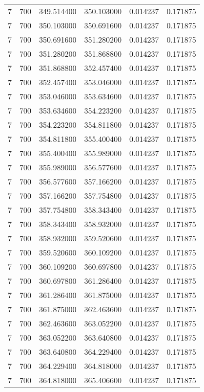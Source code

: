 \begin{longtable}{rrrrrr}
7 & 700 & 349.514400 & 350.103000 & 0.014237 & 0.171875 \\
7 & 700 & 350.103000 & 350.691600 & 0.014237 & 0.171875 \\
7 & 700 & 350.691600 & 351.280200 & 0.014237 & 0.171875 \\
7 & 700 & 351.280200 & 351.868800 & 0.014237 & 0.171875 \\
7 & 700 & 351.868800 & 352.457400 & 0.014237 & 0.171875 \\
7 & 700 & 352.457400 & 353.046000 & 0.014237 & 0.171875 \\
7 & 700 & 353.046000 & 353.634600 & 0.014237 & 0.171875 \\
7 & 700 & 353.634600 & 354.223200 & 0.014237 & 0.171875 \\
7 & 700 & 354.223200 & 354.811800 & 0.014237 & 0.171875 \\
7 & 700 & 354.811800 & 355.400400 & 0.014237 & 0.171875 \\
7 & 700 & 355.400400 & 355.989000 & 0.014237 & 0.171875 \\
7 & 700 & 355.989000 & 356.577600 & 0.014237 & 0.171875 \\
7 & 700 & 356.577600 & 357.166200 & 0.014237 & 0.171875 \\
7 & 700 & 357.166200 & 357.754800 & 0.014237 & 0.171875 \\
7 & 700 & 357.754800 & 358.343400 & 0.014237 & 0.171875 \\
7 & 700 & 358.343400 & 358.932000 & 0.014237 & 0.171875 \\
7 & 700 & 358.932000 & 359.520600 & 0.014237 & 0.171875 \\
7 & 700 & 359.520600 & 360.109200 & 0.014237 & 0.171875 \\
7 & 700 & 360.109200 & 360.697800 & 0.014237 & 0.171875 \\
7 & 700 & 360.697800 & 361.286400 & 0.014237 & 0.171875 \\
7 & 700 & 361.286400 & 361.875000 & 0.014237 & 0.171875 \\
7 & 700 & 361.875000 & 362.463600 & 0.014237 & 0.171875 \\
7 & 700 & 362.463600 & 363.052200 & 0.014237 & 0.171875 \\
7 & 700 & 363.052200 & 363.640800 & 0.014237 & 0.171875 \\
7 & 700 & 363.640800 & 364.229400 & 0.014237 & 0.171875 \\
7 & 700 & 364.229400 & 364.818000 & 0.014237 & 0.171875 \\
7 & 700 & 364.818000 & 365.406600 & 0.014237 & 0.171875 \\

\end{longtable}
